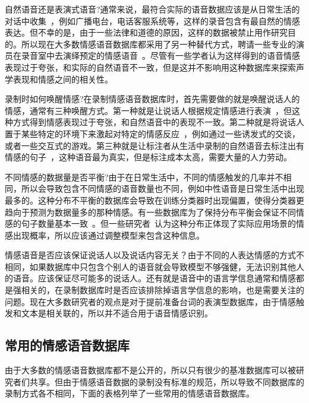 自然语音还是表演式语音?通常来说，最符合实际的语音数据应该是从日常生活的对话中收集~\cite{Campbell2000Databases}，例如广播电台，电话客服系统等，这样的录音包含有最自然的情感表达。但不幸的是，由于一些法律和道德的原因，这样的数据被禁止用作研究目的。所以现在大多数情感语音数据库都采用了另一种替代方式，聘请一些专业的演员在录音室中去演绎预定的情感语音~\cite{Mazuka2015Emotions}。尽管有一些学者认为这样得到的语音情感表现过于夸张，和实际的自然语音不一致，但是这并不影响用这种数据库来探索声学表现和情感之间的相关性。

录制时如何唤醒情感?在录制情感语音数据库时，首先需要做的就是唤醒说话人的情感，通常有三种唤醒方式。第一种就是让说话人根据规定情感进行表演~\cite{Lee2005Toward}，但这种方式得到情感表现过于夸张，和自然语音中的表现不一致。第二种就是将说话人置于某些特定的环境下来激起对特定的情感反应~\cite{Batliner2000Desperately}，例如通过一些诱发式的交谈，或者一些交互式的游戏。第三种就是让标注者从生活中录制的自然语音去标注出有情感的句子~\cite{Johnstone2005Affective}，这种语音最为真实，但是标注成本太高，需要大量的人力劳动。

不同情感的数据量是否平衡?由于在日常生活中，不同的情感触发的几率并不相同，所以会导致包含不同情感的语音数量也不同，例如中性语音是日常生活中出现最多的。这种分布不平衡的数据库会导致在训练分类器时出现偏置，使得分类器更趋向于预测为数据量多的那种情感。有一些数据库为了保持分布平衡会保证不同情感的句子数量基本一致~\cite{Burkhardt2005A}。但一些研究者~\cite{Hansen1997Getting, Morrison2007Ensemble}认为这种分布正体现了实际应用场景的情感出现概率，所以应该通过调整模型来包含这种信息。

情感语音是否应该保证说话人以及说话内容无关？由于不同的人表达情感的方式不相同，如果数据库中只包含个别人的语音就会导致模型不够强健，无法识别其他人的语音。应该保证尽可能多的说话人。还有就是语音中的语言学信息通常和情感都是强相关的，在录制数据库时是否应该排除掉语言学信息的影响，也是需要关注的问题。现在大多数研究者的观点是对于提前准备台词的表演型数据库，由于情感触发和文本是相关联的，所以并不适合用于语音情感识别。

\subsection{常用的情感语音数据库}
\label{ssec:available_database}
由于大多数的情感语音数据库都不是公开的，所以只有很少的基准数据库可以被研究者们共享。但由于情感语音数据的录制没有标准的规范，所以导致不同数据库的录制方式各不相同，下面的表格列举了一些常用的情感语音数据库。

